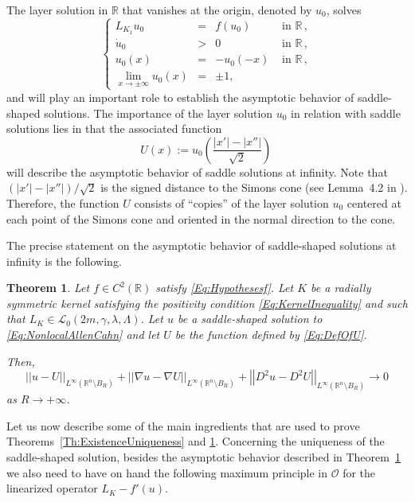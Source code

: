 \documentclass[12pt,reqno]{amsart}
\newtheorem{theorem}{Theorem}[section]
\theoremstyle{definition}
\theoremstyle{remark}
\newcommand{\con}[1]{\mathbb{#1}}
\newcommand{\R}{\con{R}} %
\newcommand{\lcal}{\mathcal{L}}
\newcommand{\ocal}{\mathcal{O}}
\newcommand{\norm}[1]{\left | \left |{#1} \right | \right |}
\newcommand{\s}{\gamma}
\newcommand\beqc[1]{\left\{\begin{array}{#1}}
\newcommand\eeqc{\end{array} \right.}
\def\PDEsystem{rcll}
\def\ds{\displaystyle}
\numberwithin{equation}{section}
\begin{document}
The layer solution in $\R$ that vanishes at the origin, denoted by $u_0$, solves
\begin{equation}
\label{Eq:LayerSolution}
\beqc{\PDEsystem}
L_{K_1}  u_0 &=& f(u_0) & \textrm{ in }\R\,,\\
\dot{u}_0 &>& 0 & \textrm{ in } \R\,,\\
u_0(x) & = &-u_0(-x)  & \textrm{ in }\R\,,\\
\ds \lim_{x \to \pm \infty} u_0(x) &=& \pm 1, & 
\eeqc
\end{equation}
and will play an important role to establish the asymptotic behavior of saddle-shaped solutions. The importance of the layer solution $u_0$ in relation with saddle solutions lies in that the associated function
\begin{equation}
\label{Eq:DefOfU}
U(x):= u_0 \left( \dfrac{|x'| - |x''|}{\sqrt{2}} \right)\,
\end{equation}
will describe the asymptotic behavior of saddle solutions at infinity. Note that $(|x'| - |x''| )/\sqrt{2}$ is the signed distance to the Simons cone (see Lemma~4.2 in \cite{CabreTerraII}). Therefore, the function $U$ consists of ``copies'' of the layer solution $u_0$ centered at each point of the Simons cone and oriented in the normal direction to the cone.

The precise statement on the asymptotic behavior of saddle-shaped solutions at infinity is the following.

\begin{theorem}
	\label{Th:AsymptoticBehaviorSaddleSolution}
	Let $f\in C^2(\R)$ satisfy \eqref{Eq:Hypothesesf}. Let $K$ be a radially symmetric kernel satisfying the positivity condition \eqref{Eq:KernelInequality} and such that $L_K\in \lcal_0(2m, \s, \lambda, \Lambda)$. Let $u$ be a saddle-shaped solution to \eqref{Eq:NonlocalAllenCahn} and let $U$ be the function defined by \eqref{Eq:DefOfU}.
	
	Then,
	$$
	\norm{u-U}_{L^\infty(\R^n\setminus B_R)}
	+\norm{\nabla u-\nabla U}_{L^\infty(\R^n\setminus B_R)}
	+\norm{D^2u-D^2U}_{L^\infty(\R^n\setminus B_R)} \to 0
	$$
	as $ R\to +\infty$.
\end{theorem}


Let us now describe some of the main ingredients that are used to prove Theorems~\ref{Th:ExistenceUniqueness} and \ref{Th:AsymptoticBehaviorSaddleSolution}. Concerning the uniqueness of the saddle-shaped solution, besides the asymptotic behavior described in Theorem~\ref{Th:AsymptoticBehaviorSaddleSolution} we also need to have on hand the following maximum principle in $\ocal$ for the linearized operator $L_K - f'(u)$.
\end{document}
